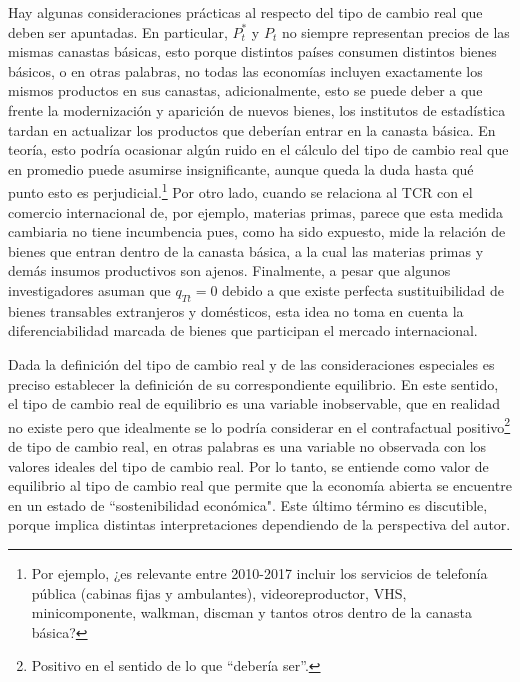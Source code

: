 \documentclass[12pt,letterpaper]{article}
\begin{document}
Hay algunas consideraciones prácticas al respecto del tipo de cambio real que deben ser apuntadas. En particular, $P_t^*$ y $P_t$ no siempre representan precios de las mismas canastas básicas, esto porque distintos países consumen distintos bienes básicos, o en otras palabras, no todas las economías incluyen exactamente los mismos productos en sus canastas, adicionalmente, esto se puede deber a que frente la modernización y aparición de nuevos bienes, los institutos de estadística tardan en actualizar los productos que deberían entrar en la canasta básica. En teoría, esto podría ocasionar algún ruido en el cálculo del tipo de cambio real que en promedio puede asumirse insignificante, aunque queda la duda hasta qué punto esto es perjudicial.\footnote{Por ejemplo, ¿es relevante entre 2010-2017 incluir los servicios de telefonía pública (cabinas fijas y ambulantes), videoreproductor, VHS, minicomponente, walkman, discman y tantos otros dentro de la canasta básica?} Por otro lado, cuando se relaciona al TCR con el comercio internacional de, por ejemplo, materias primas, parece que esta medida cambiaria no tiene incumbencia pues, como ha sido expuesto, mide la relación de bienes que entran dentro de la canasta básica, a la cual las materias primas y demás insumos productivos son ajenos. Finalmente, a pesar que algunos investigadores asuman que $q_{Tt}=0$ debido a que existe perfecta sustituibilidad de bienes transables extranjeros y domésticos, esta idea no toma en cuenta la diferenciabilidad marcada de bienes que participan el mercado internacional. %

Dada la definición del tipo de cambio real y de las consideraciones especiales es preciso establecer la definición de su correspondiente equilibrio. En este sentido, el tipo de cambio real de equilibrio es una variable inobservable, que en realidad no existe pero que idealmente se lo podría considerar en el contrafactual positivo\footnote{Positivo en el sentido de lo que ``debería ser''.} de tipo de cambio real, en otras palabras es una variable no observada con los valores ideales del tipo de cambio real. Por lo tanto, se entiende como valor de equilibrio al tipo de cambio real que permite que la economía abierta se encuentre en un estado de ``sostenibilidad económica". Este último término es discutible, porque implica distintas interpretaciones dependiendo de la perspectiva del autor.
\end{document}
